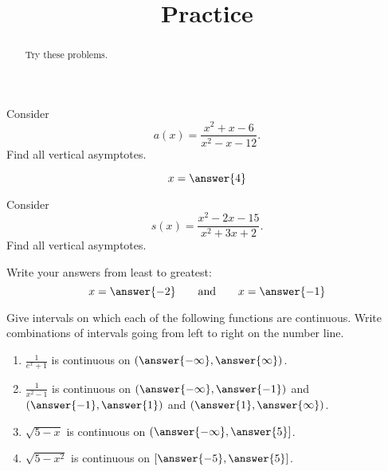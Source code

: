 \documentclass{ximera}
\title{Practice}
\begin{document}
\begin{abstract}
  Try these problems.
\end{abstract}
\maketitle


\begin{exercise}
Consider 
\[a(x) = \frac{x^2+x-6}{x^2-x-12}.
\]
Find all vertical asymptotes.
\begin{prompt}
\begin{multipleChoice}
\end{multipleChoice}
\begin{exercise} 
\[
x=\answer{4}
\]
\end{exercise}
\end{prompt}
\end{exercise}

\begin{exercise}
Consider 
\[s(x) = \frac{x^2-2 x-15}{x^2+3 x+2}.
\]
Find all vertical asymptotes.
\begin{prompt}
\begin{multipleChoice}
\end{multipleChoice}
\begin{exercise}Write your answers from least to greatest:
\[
x=\answer{-2}\qquad\text{and}\qquad x=\answer{-1}
\]
\end{exercise}
\end{prompt}
\end{exercise}


\begin{exercise}



Give intervals on which each of the following functions are
continuous. Write combinations of intervals going from left to right
on the number line.

\begin{enumerate}
\item $\frac{1}{e^x+1}$ is continuous on $(\answer{-\infty},\answer{\infty})$.
\item $\frac{1}{x^2-1}$ is continuous on $(\answer{-\infty},\answer{-1})$ and $(\answer{-1},\answer{1})$ and $(\answer{1},\answer{\infty})$.
\item $\sqrt{5-x}$ is continuous on $(\answer{-\infty},\answer{5}]$.
\item $\sqrt{5-x^2}$ is continuous on $[\answer{-5},\answer{5}]$.
\end{enumerate}

\end{exercise}
\end{document}
